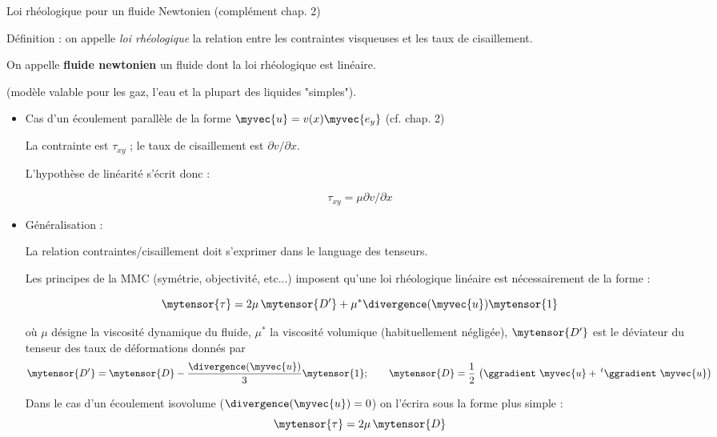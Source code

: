 \begin{frame}{Loi rhéologique pour un fluide Newtonien (complément chap. 2)}

\small


\smallskip

Définition : on appelle {\em loi rhéologique } la relation entre les contraintes visqueuses et les taux de cisaillement.


\smallskip

On appelle \textbf{fluide newtonien} un fluide dont la loi rhéologique est linéaire.

(modèle valable pour les gaz, l'eau et la plupart des liquides "simples").




\begin{itemize}
\pause
\item 
Cas d'un écoulement parallèle de la forme $\myvec{u} = v(x) \myvec{e_y}$ (cf. chap. 2)

La contrainte est $\tau_{xy}$ ; le taux de cisaillement est $\partial v/\partial x$.

L'hypothèse de linéarité s'écrit donc :

 $$
 \tau_{xy} = \mu \partial v/\partial x
 $$
 \medskip 

\pause 
\item Généralisation :

La relation contraintes/cisaillement doit s'exprimer dans le language des tenseurs.

Les principes de la MMC (symétrie, objectivité, etc...) imposent qu'une loi rhéologique linéaire 
est nécessairement de la forme :

\[
	\mytensor{\tau} = 2 \mu \, \mytensor{D'} + \mu^* \divergence(\myvec{u}) \mytensor{1}
\] 

où $\mu$ désigne la viscosité dynamique du fluide, $\mu^*$ la viscosité volumique (habituellement négligée),
$\mytensor{D'}$ est le déviateur du tenseur des taux de déformations donnés par
\[
\mytensor{D'} = \mytensor{D} - \frac{\divergence(\myvec{u})}{3}  \mytensor{1} ; 
\qquad 
	\mytensor{D} = \frac{1}{2}\, \left ( \ggradient\ \myvec{u} + \,^t\ggradient\ \myvec{u} \right )
\] 

Dans le cas d'un écoulement isovolume ($\divergence(\myvec{u}) = 0$) 
on l'écrira sous la forme plus simple :
\[
\mytensor{\tau} = 2 \mu \, \mytensor{D} 
\]
\end{itemize}


\end{frame}


